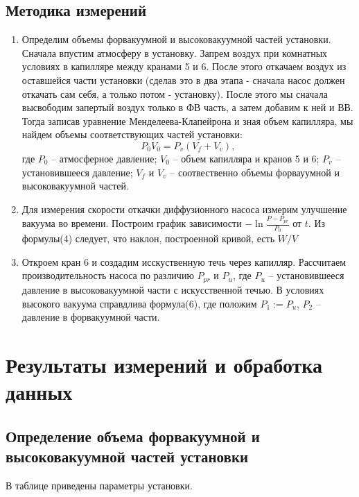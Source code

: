 \documentclass[a4paper,12pt]{article}
\begin{document}
    \subsection*{Методика измерений}
    \begin{enumerate}
    \item
	    Определим объемы форвакуумной и высоковакуумной частей установки. Сначала впустим атмосферу в установку. Запрем воздух при комнатных условиях в капилляре между кранами 5 и 6. После этого откачаем воздух из оставшейся части установки (сделав это в два этапа - сначала насос должен откачать сам себя, а только потом - установку). После этого мы сначала высвободим запертый воздух только в ФВ часть, а затем добавим к ней и ВВ. Тогда записав уравнение Менделеева-Клапейрона и зная объем капилляра, мы найдем объемы соответствующих частей установки:
    \begin{equation}
	    P_0 V_0 = P_v (V_f + V_v),
    \end{equation}
    где $P_0$ -- атмосферное давление; $V_0$ -- объем капилляра и кранов 5 и 6; $P_v$ -- установившееся давление; $V_f$ и $V_v$ -- соотвественно объемы форвауумной и высоковакуумной частей.
	
    \item
	    Для измерения скорости откачки диффузионного насоса измерим улучшение вакуума во времени. Построим график зависимости $-\ln{\frac{P-P_{pr}}{P_0}}$ от $t$. Из формулы(4) следует, что наклон, построенной кривой, есть $W / V$

    \item
	    Откроем кран 6 и создадим исскуственную течь через капилляр. Рассчитаем производительность насоса по различию $P_{pr}$ и $P_u$, где $P_u$ -- установившееся давление в высоковакуумной части с искусственной течью. В условиях высокого вакуума справдлива формула(6), где положим $P_1 := P_u$, $P_2$ -- давление в форвакуумной части. 
    \end{enumerate}

    \section{Результаты измерений и обработка данных}

    \subsection*{Определение объема форвакуумной и высоковакуумной частей установки}

    В таблице  приведены параметры установки.
	
\end{document}
